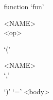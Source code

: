 \documentclass[convert={outext=.png}]{standalone}
\begin{document}
\begin{málrit}{function}
  `fun'
  \begin{stack}
    <NAME> \\ <op>
	\end{stack}
	 `('
	\begin{repnull}
		<NAME>\\
		`,'
	\end{repnull}
	 `)' `=' <body>
\end{málrit}
\end{document}
